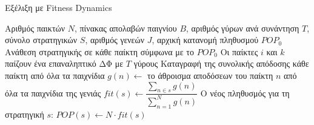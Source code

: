 \documentclass[12pt]{report}
\begin{document}
\begin{algorithm}[H]
\caption{Εξέλιξη με \foreignlanguage{english}{Fitness Dynamics}}
\label{alg:FitnessDyns}
\begin{algorithmic}[1]
\REQUIRE Αριθμός παικτών $N$, πίνακας απολαβών παιγνίου $B$, αριθμός γύρων ανά συνάντηση $T$, σύνολο στρατηγικών $S$, αριθμός γενεών $J$, αρχική κατανομή πληθυσμού $POP_0$
\STATE Ανάθεση στρατηγικής σε κάθε παίκτη σύμφωνα με το $POP_0$
        \STATE Οι παίκτες $i$ και $k$ παίζουν ένα επαναληπτικό ΔΦ με $T$ γύρους
        \STATE Καταγραφή της συνολικής απόδοσης κάθε παίκτη από όλα τα παιχνίδια
    \ENDFOR
        \STATE $g(n) \gets$ το άθροισμα αποδόσεων του παίκτη $n$ από όλα τα παιχνίδια της γενιάς
    \ENDFOR
        \STATE $fit(s) \gets \dfrac{\sum_{n \in s} g(n)}{\sum_{n=1}^{N} g(n)}$ \label{fitness_percentage}
        \STATE Ο νέος πληθυσμός για τη στρατηγική $s$: $POP(s) \gets N \cdot fit(s)$ \label{float_pops}
    \ENDFOR
\ENDFOR
    \end{algorithmic}
\end{algorithm}
\end{document}
